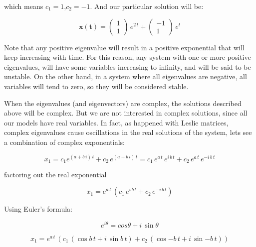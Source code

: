 \documentclass{tufte-book} %
\begin{document}
which means $c_1=1$,$c_2=-1$. And our particular solution will be:

\begin{equation}
	\mathbf{x(t)}=   \begin{pmatrix} 1 \\ 1 \end{pmatrix} \, e^{2 \, t} +  \begin{pmatrix} -1 \\ 1 \end{pmatrix} \, e^{t} 
\end{equation}

Note that any positive eigenvalue will result in a positive exponential that will keep increasing with time. For this reason, any system with one or more positive eigenvalues, will have some variables increasing to infinity, and will be said to be unstable. On the other hand, in a system where all eigenvalues are negative, all variables will tend to zero, so they will be considered stable.


When the eigenvalues (and eigenvectors) are complex, the solutions described above will be complex. But we are not interested in complex solutions, since all our models have real variables. In fact, as happened with Leslie matrices, complex eigenvalues cause oscillations in the real solutions of the system, lets see a combination of complex exponentials:

\begin{equation}
	x_1= c_1 e^{\left(  a + b\, i\right) \, t} + c_2 \,  e^{\left(  a + b\, i\right)\, t} = 
	c_1  \, e^{a \, t} \, e^{ i \, b \, t} + c_2 \,  e^{a \, t} \, e^{-i \, b \, t} 
	\nonumber
\end{equation}

factoring out the real exponential

\begin{equation}
x_1= e^{a \, t} \,  \left( c_1  \, e^{ i \, b \, t} + c_2 \,  e^{-i \, b \, t}\right) \nonumber
\end{equation}

Using Euler's formula:

\begin{equation}
	\label{euler}
	e^{i \theta} = cos \theta + i \, \sin \theta 
\end{equation}

\begin{equation}
	x_1= e^{a \, t} \,  \left( c_1  \, \left(  \cos{ b \, t} + i \, \sin{ b \, t} \right)+ c_2 \, \left( \cos{- b \, t} + i \, \sin{- b \, t} \right) \right) \nonumber
\end{equation}
\end{document}
